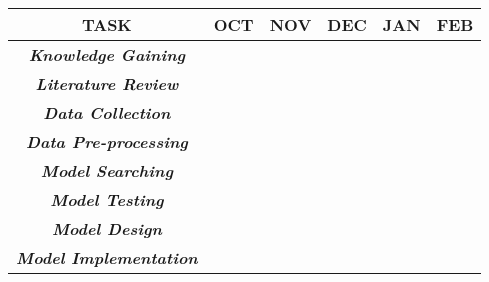 \FloatBarrier
\begin{table}[]
\centering
\begin{tabular}{|c|l|l|l|l|l|}
\hline
\textbf{TASK}                                 & \multicolumn{1}{c|}{\textbf{OCT}}             & \multicolumn{1}{c|}{\textbf{NOV}}             & \textbf{DEC}             & \textbf{JAN}             & \textbf{FEB}             \\ \hline
\textit{\textbf{Knowledge Gaining}}           & \multicolumn{1}{c|}{\cellcolor[HTML]{FFCB2F}} & \multicolumn{1}{c|}{\cellcolor[HTML]{FFCB2F}} & \cellcolor[HTML]{FFCB2F} & \cellcolor[HTML]{FFCB2F} & \cellcolor[HTML]{FFCB2F} \\ \hline
\textit{\textbf{Literature Review}}           & \multicolumn{1}{c|}{\cellcolor[HTML]{FFCB2F}} & \multicolumn{1}{c|}{\cellcolor[HTML]{FFCB2F}} & \cellcolor[HTML]{FFCB2F} &                          &                          \\ \hline
\textit{\textbf{Data Collection}}             & \multicolumn{1}{c|}{}                         & \multicolumn{1}{c|}{\cellcolor[HTML]{FFCB2F}} & \cellcolor[HTML]{FFCB2F} &                          &                          \\ \hline
\textit{\textbf{Data Pre-processing}}         & \multicolumn{1}{c|}{}                         & \multicolumn{1}{c|}{\cellcolor[HTML]{FFCB2F}} & \cellcolor[HTML]{FFCB2F} &                          &                          \\ \hline
\textit{\textbf{Model Searching}}             &                                               & \cellcolor[HTML]{FFCB2F}                      & \cellcolor[HTML]{FFCB2F} &                          &                          \\ \hline
\textit{\textbf{Model Testing}}               &                                               &                                               & \cellcolor[HTML]{FFCB2F} & \cellcolor[HTML]{FFCB2F} &                          \\ \hline
\textit{\textbf{Model Design}}                &                                               &                                               & \cellcolor[HTML]{FFCB2F} & \cellcolor[HTML]{FFCB2F} &                          \\ \hline
\textit{\textbf{Model Implementation}}        &                                               &                                               & \cellcolor[HTML]{FFCB2F} & \cellcolor[HTML]{FFCB2F} &                          \\ \hline

\end{tabular}
\end{table}
